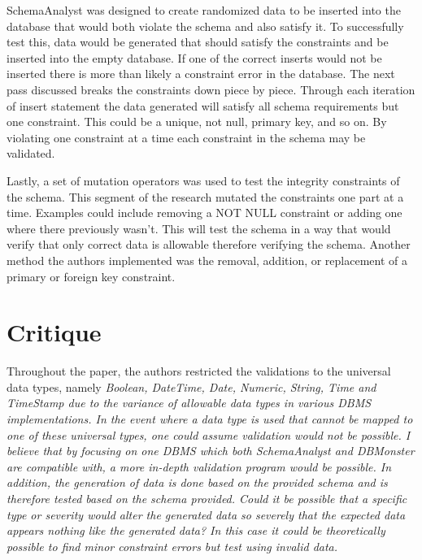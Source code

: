 \documentclass[11pt]{article}
\begin{document}
SchemaAnalyst was designed to create randomized data to be inserted into the database that would both violate the schema and also satisfy it. To successfully test this, data would be generated that should satisfy the constraints and be inserted into the empty database. If one of the correct inserts would not be inserted there is more than likely a constraint error in the database. The next pass discussed breaks the constraints down piece by piece. Through each iteration of insert statement the data generated will satisfy all schema requirements but one constraint. This could be a unique, not null, primary key, and so on. By violating one constraint at a time each constraint in the schema may be validated.

Lastly, a set of mutation operators was used to test the integrity constraints of the schema. \cite{Kapfhammer2013} This segment of the research mutated the constraints one part at a time. Examples could include removing a NOT NULL constraint or adding one where there previously wasn't. This will test the schema in a way that would verify that only correct data is allowable therefore verifying the schema. Another method the authors implemented was the removal, addition, or replacement of a primary or foreign key constraint.

\vspace*{-.1in}
\section{Critique}
\label{sec:critique}
\vspace*{-.1in}

Throughout the paper, the authors restricted the validations to the universal data types, namely \em{Boolean, DateTime, Date, Numeric, String, Time} and \em{TimeStamp} \cite{Kapfhammer2013} due to the variance of allowable data types in various DBMS implementations. In the event where a data type is used that cannot be mapped to one of these universal types, one could assume validation would not be possible. I believe that by focusing on one DBMS which both SchemaAnalyst and DBMonster are compatible with, a more in-depth validation program would be possible. In addition, the generation of data is done based on the provided schema and is therefore tested based on the schema provided. Could it be possible that a specific type or severity would alter the generated data so severely that the expected data appears nothing like the generated data? In this case it could be theoretically possible to find minor constraint errors but test using invalid data.
\end{document}
